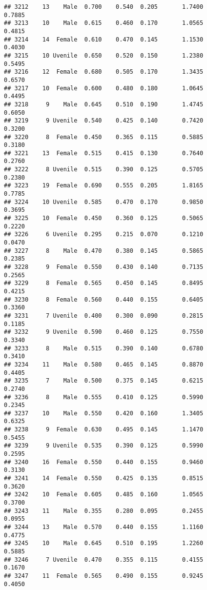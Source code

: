\documentclass[
]{article}
\begin{document}
\begin{verbatim}
## 3212    13    Male  0.700    0.540  0.205       1.7400         0.7885
## 3213    10    Male  0.615    0.460  0.170       1.0565         0.4815
## 3214    14  Female  0.610    0.470  0.145       1.1530         0.4030
## 3215    10 Uvenile  0.650    0.520  0.150       1.2380         0.5495
## 3216    12  Female  0.680    0.505  0.170       1.3435         0.6570
## 3217    10  Female  0.600    0.480  0.180       1.0645         0.4495
## 3218     9    Male  0.645    0.510  0.190       1.4745         0.6050
## 3219     9 Uvenile  0.540    0.425  0.140       0.7420         0.3200
## 3220     8  Female  0.450    0.365  0.115       0.5885         0.3180
## 3221    13  Female  0.515    0.415  0.130       0.7640         0.2760
## 3222     8 Uvenile  0.515    0.390  0.125       0.5705         0.2380
## 3223    19  Female  0.690    0.555  0.205       1.8165         0.7785
## 3224    10 Uvenile  0.585    0.470  0.170       0.9850         0.3695
## 3225    10  Female  0.450    0.360  0.125       0.5065         0.2220
## 3226     6 Uvenile  0.295    0.215  0.070       0.1210         0.0470
## 3227     8    Male  0.470    0.380  0.145       0.5865         0.2385
## 3228     9  Female  0.550    0.430  0.140       0.7135         0.2565
## 3229     8  Female  0.565    0.450  0.145       0.8495         0.4215
## 3230     8  Female  0.560    0.440  0.155       0.6405         0.3360
## 3231     7 Uvenile  0.400    0.300  0.090       0.2815         0.1185
## 3232     9 Uvenile  0.590    0.460  0.125       0.7550         0.3340
## 3233     8    Male  0.515    0.390  0.140       0.6780         0.3410
## 3234    11    Male  0.580    0.465  0.145       0.8870         0.4405
## 3235     7    Male  0.500    0.375  0.145       0.6215         0.2740
## 3236     8    Male  0.555    0.410  0.125       0.5990         0.2345
## 3237    10    Male  0.550    0.420  0.160       1.3405         0.6325
## 3238     9  Female  0.630    0.495  0.145       1.1470         0.5455
## 3239     9 Uvenile  0.535    0.390  0.125       0.5990         0.2595
## 3240    16  Female  0.550    0.440  0.155       0.9460         0.3130
## 3241    14  Female  0.550    0.425  0.135       0.8515         0.3620
## 3242    10  Female  0.605    0.485  0.160       1.0565         0.3700
## 3243    11    Male  0.355    0.280  0.095       0.2455         0.0955
## 3244    13    Male  0.570    0.440  0.155       1.1160         0.4775
## 3245    10    Male  0.645    0.510  0.195       1.2260         0.5885
## 3246     7 Uvenile  0.470    0.355  0.115       0.4155         0.1670
## 3247    11  Female  0.565    0.490  0.155       0.9245         0.4050

\end{verbatim}
\end{document}
